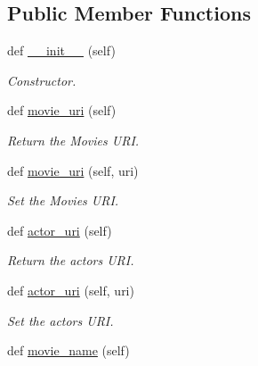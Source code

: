 \subsection*{Public Member Functions}
\begin{DoxyCompactItemize}
\item 
def \hyperlink{classbridges_1_1data__src__dependent_1_1movie__actor__wiki__data_1_1_moviegctor_wiki_data_a20d18c13877ee818bbd69b708c756683}{\+\_\+\+\_\+init\+\_\+\+\_\+} (self)
\begin{DoxyCompactList}\small\item\em Constructor. \end{DoxyCompactList}\item 
def \hyperlink{classbridges_1_1data__src__dependent_1_1movie__actor__wiki__data_1_1_moviegctor_wiki_data_a5a0d5cc5d8326ebc7e1fce80decb63fa}{movie\+\_\+uri} (self)
\begin{DoxyCompactList}\small\item\em Return the Movie\textquotesingle{}s U\+RI. \end{DoxyCompactList}\item 
def \hyperlink{classbridges_1_1data__src__dependent_1_1movie__actor__wiki__data_1_1_moviegctor_wiki_data_a117993e95f4b9ab03b2cfeaa933eb0e0}{movie\+\_\+uri} (self, uri)
\begin{DoxyCompactList}\small\item\em Set the Movie\textquotesingle{}s U\+RI. \end{DoxyCompactList}\item 
def \hyperlink{classbridges_1_1data__src__dependent_1_1movie__actor__wiki__data_1_1_moviegctor_wiki_data_a9a8293fab16f089e63aa7ea35f691655}{actor\+\_\+uri} (self)
\begin{DoxyCompactList}\small\item\em Return the actor\textquotesingle{}s U\+RI. \end{DoxyCompactList}\item 
def \hyperlink{classbridges_1_1data__src__dependent_1_1movie__actor__wiki__data_1_1_moviegctor_wiki_data_a0a160c405e419d30823c3794f28d5226}{actor\+\_\+uri} (self, uri)
\begin{DoxyCompactList}\small\item\em Set the actor\textquotesingle{}s U\+RI. \end{DoxyCompactList}\item 
def \hyperlink{classbridges_1_1data__src__dependent_1_1movie__actor__wiki__data_1_1_moviegctor_wiki_data_af6191448d9b12a50b1024644d0ad4ba2}{movie\+\_\+name} (self)

\end{DoxyCompactItemize}
